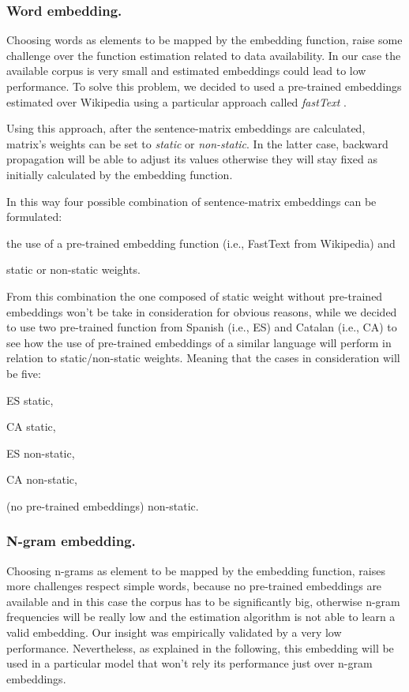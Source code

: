 \subsubsection{Word embedding.}
Choosing words as elements to be mapped by the embedding function, raise some challenge over the function estimation related to data availability. In our case the available corpus is very small and estimated embeddings could lead to low performance.
To solve this problem, we decided to used a pre-trained embeddings estimated over Wikipedia using a particular approach called \emph{fastText} \cite{bojanowski2016enriching}.

Using this approach, after the sentence-matrix embeddings are calculated, matrix's weights can be set to \emph{static} or \emph{non-static}. In the latter case, backward propagation will be able to adjust its values otherwise they will stay fixed as initially calculated by the embedding function.

In this way four possible combination of sentence-matrix embeddings can be formulated: 
\begin{enumerate*}
\item the use of a pre-trained embedding function (i.e., FastText from Wikipedia) and
\item static or non-static weights.
\end{enumerate*}
From this combination the one composed of static weight without pre-trained embeddings won't be take in consideration for obvious reasons, while we decided to use two pre-trained function from Spanish (i.e., ES) and Catalan (i.e., CA) to see how the use of pre-trained embeddings of a similar language will perform in relation to static/non-static weights.
Meaning that the cases in consideration will be five:
\begin{enumerate*}
\item ES static,
\item CA static,
\item ES non-static,
\item CA non-static,
\item (no pre-trained embeddings) non-static.
\end{enumerate*}

\subsubsection{N-gram embedding.}
Choosing n-grams as element to be mapped by the embedding function, raises more challenges respect simple words, because no pre-trained embeddings are available and in this case the corpus has to be significantly big, otherwise n-gram frequencies will be really low and the estimation algorithm is not able to learn a valid embedding.
Our insight was empirically validated by a very low performance. Nevertheless, as explained in the following, this embedding will be used in a particular model that won't rely its performance just over n-gram embeddings.


